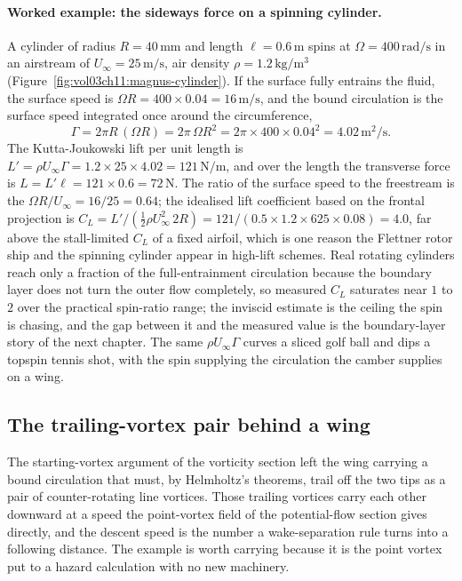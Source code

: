 \paragraph{Worked example: the sideways force on a spinning cylinder.}
A cylinder of radius $R = 40\,\si{\milli\meter}$ and length $\ell =
0.6\,\si{\meter}$ spins at $\Omega = 400\,\si{\radian\per\second}$ in
an airstream of $U_\infty = 25\,\si{\meter\per\second}$, air density
$\rho = 1.2\,\si{\kilogram\per\meter\cubed}$
(Figure~\ref{fig:vol03ch11:magnus-cylinder}). If the surface fully
entrains the fluid, the surface speed is $\Omega R = 400\times 0.04 =
16\,\si{\meter\per\second}$, and the bound circulation is the surface
speed integrated once around the circumference,
\[
\Gamma = 2\pi R\,(\Omega R) = 2\pi\,\Omega R^2
= 2\pi\times 400\times 0.04^2
= 4.02\,\si{\meter\squared\per\second}.
\]
The Kutta-Joukowski lift per unit length is $L' = \rho U_\infty\Gamma =
1.2\times 25\times 4.02 = 121\,\si{\newton\per\meter}$, and over the
length the transverse force is $L = L'\ell = 121\times 0.6 =
72\,\si{\newton}$. The ratio of the surface speed to the freestream is
the  $\Omega R/U_\infty = 16/25 = 0.64$; the
idealised lift coefficient based on the frontal projection is
$C_L = L'/(\tfrac12\rho U_\infty^2\,2R) = 121/(0.5\times 1.2\times
625\times 0.08) = 4.0$, far above the stall-limited $C_L$ of a fixed
airfoil, which is one reason the Flettner rotor ship and the spinning
cylinder appear in high-lift schemes. Real rotating cylinders reach
only a fraction of the full-entrainment circulation because the
boundary layer does not turn the outer flow completely, so measured
$C_L$ saturates near $1$ to $2$ over the practical spin-ratio range;
the inviscid estimate is the ceiling the spin is chasing, and the
gap between it and the measured value is the boundary-layer story of
the next chapter. The same $\rho U_\infty\Gamma$ curves a sliced golf
ball and dips a topspin tennis shot, with the spin supplying the
circulation the camber supplies on a wing.

\subsection{The trailing-vortex pair behind a wing}

The starting-vortex argument of the vorticity section left the wing
carrying a bound circulation that must, by Helmholtz's theorems, trail
off the two tips as a pair of counter-rotating line vortices. Those
trailing vortices carry each other downward at a speed the point-vortex
field of the potential-flow section gives directly, and the descent
speed is the number a wake-separation rule turns into a following
distance. The example is worth carrying because it is the point vortex
put to a hazard calculation with no new machinery.

